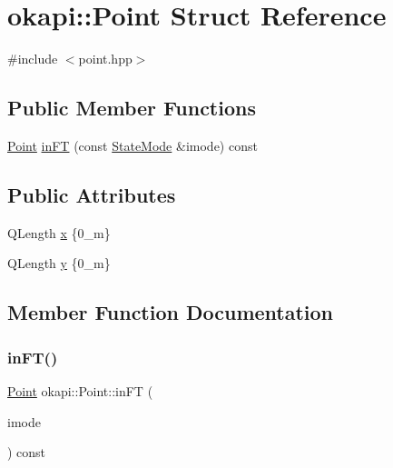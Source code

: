 \hypertarget{structokapi_1_1Point}{}\section{okapi\+::Point Struct Reference}
\label{structokapi_1_1Point}


{\ttfamily \#include $<$point.\+hpp$>$}

\subsection*{Public Member Functions}
\begin{DoxyCompactItemize}
\item 
\mbox{\hyperlink{structokapi_1_1Point}{Point}} \mbox{\hyperlink{structokapi_1_1Point_a98fb5f28afff23f35318297cfb3131e5}{in\+FT}} (const \mbox{\hyperlink{namespaceokapi_af37fbd761bd859a00ff4dd4a87dd8c07}{State\+Mode}} \&imode) const
\end{DoxyCompactItemize}
\subsection*{Public Attributes}
\begin{DoxyCompactItemize}
\item 
Q\+Length \mbox{\hyperlink{structokapi_1_1Point_a49a37b80b4c067214556e3da3532d2ac}{x}} \{0\+\_\+m\}
\item 
Q\+Length \mbox{\hyperlink{structokapi_1_1Point_a6acb599ade55d1df76ad805ac6bb174d}{y}} \{0\+\_\+m\}
\end{DoxyCompactItemize}


\subsection{Member Function Documentation}
\mbox{\label{structokapi_1_1Point_a98fb5f28afff23f35318297cfb3131e5}} 
\subsubsection{\texorpdfstring{inFT()}{inFT()}}
{\footnotesize\ttfamily \mbox{\hyperlink{structokapi_1_1Point}{Point}} okapi\+::\+Point\+::in\+FT (\begin{DoxyParamCaption}\item[{const \mbox{\hyperlink{namespaceokapi_af37fbd761bd859a00ff4dd4a87dd8c07}{State\+Mode}} \&}]{imode }\end{DoxyParamCaption}) const\hspace{0.3cm}{\ttfamily [inline]}}

